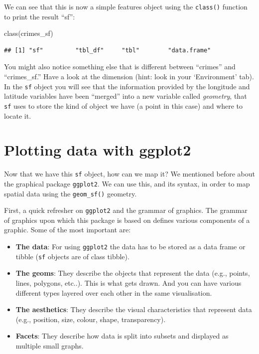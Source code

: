 \documentclass[
]{book}
\makeatletter
\newenvironment{Shaded}{\begin{snugshade}}{\end{snugshade}}
\newcommand{\FunctionTok}[1]{\textcolor[rgb]{0,0,0}{#1}}
\newcommand{\NormalTok}[1]{#1}
\newenvironment{kframe}{%
\medskip{}
\setlength{\fboxsep}{.8em}
 \def\at@end@of@kframe{}%
 \ifinner\ifhmode%
  \def\at@end@of@kframe{\end{minipage}}%
  \begin{minipage}{\columnwidth}%
 \fi\fi%
 \def\FrameCommand##1{\hskip\@totalleftmargin \hskip-\fboxsep
 \colorbox{shadecolor}{##1}\hskip-\fboxsep
     \hskip-\linewidth \hskip-\@totalleftmargin \hskip\columnwidth}%
 \MakeFramed {\advance\hsize-\width
   \@totalleftmargin\z@ \linewidth\hsize
   \@setminipage}}%
 {\par\unskip\endMakeFramed%
 \at@end@of@kframe}
\renewenvironment{Shaded}{\begin{kframe}}{\end{kframe}}
\makeatother
\begin{document}
We can see that this is now a simple features object using the \texttt{class()} function to print the result ``sf'':

\begin{Shaded}
\begin{Highlighting}[]
\FunctionTok{class}\NormalTok{(crimes\_sf)}
\end{Highlighting}
\end{Shaded}

\begin{verbatim}
## [1] "sf"         "tbl_df"     "tbl"        "data.frame"
\end{verbatim}

You might also notice something else that is different between ``crimes'' and ``crimes\_sf.'' Have a look at the dimension (hint: look in your `Environment' tab). In the \texttt{sf} object you will see that the information provided by the longitude and latitude variables have been ``merged'' into a new variable called \emph{geometry}, that \texttt{sf} uses to store the kind of object we have (a point in this case) and where to locate it.

\hypertarget{plotting-data-with-ggplot2}{%
\section{Plotting data with ggplot2}\label{plotting-data-with-ggplot2}}

Now that we have this \texttt{sf} object, how can we map it? We mentioned before about the graphical package \texttt{ggplot2}. We can use this, and its syntax, in order to map spatial data using the \texttt{geom\_sf()} geometry.

First, a quick refresher on \texttt{ggplot2} and the grammar of graphics. The grammar of graphics upon which this package is based on defines various components of a graphic. Some of the most important are:

\begin{itemize}
\item
  \textbf{The data}: For using \texttt{ggplot2} the data has to be stored as a data frame or tibble (\texttt{sf} objects are of class tibble).
\item
  \textbf{The geoms}: They describe the objects that represent the data (e.g., points, lines, polygons, etc..). This is what gets drawn. And you can have various different types layered over each other in the same visualisation.
\item
  \textbf{The aesthetics}: They describe the visual characteristics that represent data (e.g., position, size, colour, shape, transparency).
\item
  \textbf{Facets}: They describe how data is split into subsets and displayed as multiple small graphs.
\end{itemize}
\end{document}
